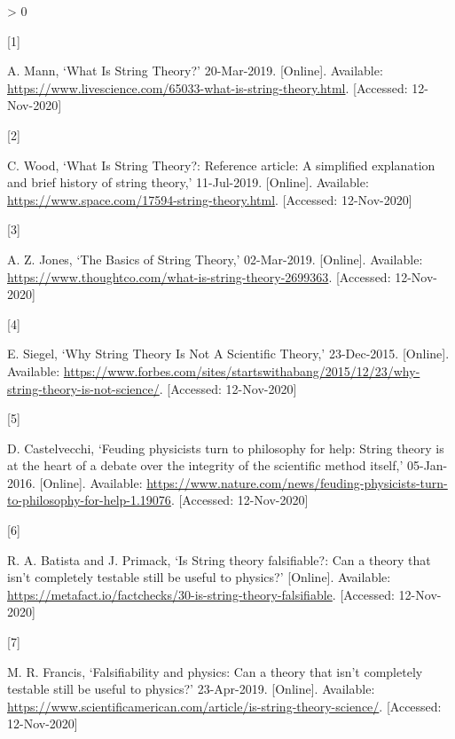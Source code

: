 \documentclass[
  11pt,
  british,
  a4paper,
]{article}
\newlength{\cslhangindent}
\newlength{\csllabelwidth}
\newenvironment{CSLReferences}[2] %
 {%
  \setlength{\parindent}{0pt}
  \ifodd #1 \everypar{\setlength{\hangindent}{\cslhangindent}}\ignorespaces\fi
  \ifnum #2 > 0
  \setlength{\parskip}{#2\baselineskip}
  \fi
 }%
 {}
\newcommand{\CSLLeftMargin}[1]{\parbox[t]{\csllabelwidth}{#1}}
\newcommand{\CSLRightInline}[1]{\parbox[t]{\linewidth - \csllabelwidth}{#1}\break}
\begin{document}
\hypertarget{refs}{}
\begin{CSLReferences}{0}{0}
\leavevmode\hypertarget{ref-mann2019}{}%
\CSLLeftMargin{{[}1{]} }
\CSLRightInline{A. Mann, {`{What Is String Theory?}'} 20-Mar-2019.
{[}Online{]}. Available:
\url{https://www.livescience.com/65033-what-is-string-theory.html}.
{[}Accessed: 12-Nov-2020{]}}

\leavevmode\hypertarget{ref-wood2019}{}%
\CSLLeftMargin{{[}2{]} }
\CSLRightInline{C. Wood, {`{What Is String Theory?}: Reference article:
A simplified explanation and brief history of string theory,'}
11-Jul-2019. {[}Online{]}. Available:
\url{https://www.space.com/17594-string-theory.html}. {[}Accessed:
12-Nov-2020{]}}

\leavevmode\hypertarget{ref-jones2020}{}%
\CSLLeftMargin{{[}3{]} }
\CSLRightInline{A. Z. Jones, {`{The Basics of String Theory},'}
02-Mar-2019. {[}Online{]}. Available:
\url{https://www.thoughtco.com/what-is-string-theory-2699363}.
{[}Accessed: 12-Nov-2020{]}}

\leavevmode\hypertarget{ref-siegel2015}{}%
\CSLLeftMargin{{[}4{]} }
\CSLRightInline{E. Siegel, {`{Why String Theory Is Not A Scientific
Theory},'} 23-Dec-2015. {[}Online{]}. Available:
\url{https://www.forbes.com/sites/startswithabang/2015/12/23/why-string-theory-is-not-science/}.
{[}Accessed: 12-Nov-2020{]}}

\leavevmode\hypertarget{ref-castelvecchi2016}{}%
\CSLLeftMargin{{[}5{]} }
\CSLRightInline{D. Castelvecchi, {`{Feuding physicists turn to
philosophy for help}: String theory is at the heart of a debate over the
integrity of the scientific method itself,'} 05-Jan-2016. {[}Online{]}.
Available:
\url{https://www.nature.com/news/feuding-physicists-turn-to-philosophy-for-help-1.19076}.
{[}Accessed: 12-Nov-2020{]}}

\leavevmode\hypertarget{ref-alves2017}{}%
\CSLLeftMargin{{[}6{]} }
\CSLRightInline{R. A. Batista and J. Primack, {`{Is String theory
falsifiable?}: Can a theory that isn't completely testable still be
useful to physics?'} {[}Online{]}. Available:
\url{https://metafact.io/factchecks/30-is-string-theory-falsifiable}.
{[}Accessed: 12-Nov-2020{]}}

\leavevmode\hypertarget{ref-francis2019}{}%
\CSLLeftMargin{{[}7{]} }
\CSLRightInline{M. R. Francis, {`{Falsifiability and physics}: Can a
theory that isn't completely testable still be useful to physics?'}
23-Apr-2019. {[}Online{]}. Available:
\url{https://www.scientificamerican.com/article/is-string-theory-science/}.
{[}Accessed: 12-Nov-2020{]}}


\end{CSLReferences}
\end{document}
